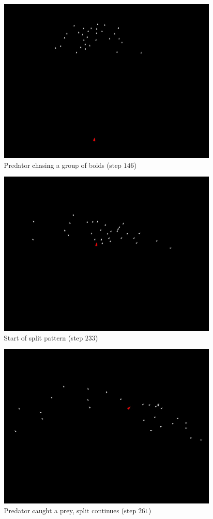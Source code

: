 \documentclass[9pt]{pnas-new}
\begin{document}
\begin{figure}[h]
	\centering
	\includegraphics[width=0.6\linewidth]{boids_step_146.jpg}
	\caption{Predator chasing a group of boids (step $146$)}
\end{figure}
\begin{figure}[h]
	\centering
	\includegraphics[width=0.6\linewidth]{boids_step_233.jpg}
	\caption{Start of split pattern (step $233$)}
\end{figure}
\begin{figure}[h]
	\centering
	\includegraphics[width=0.7\linewidth]{boids_step_261.jpg}
	\caption{Predator caught a prey, split continues (step $261$)}
\end{figure}
\end{document}
